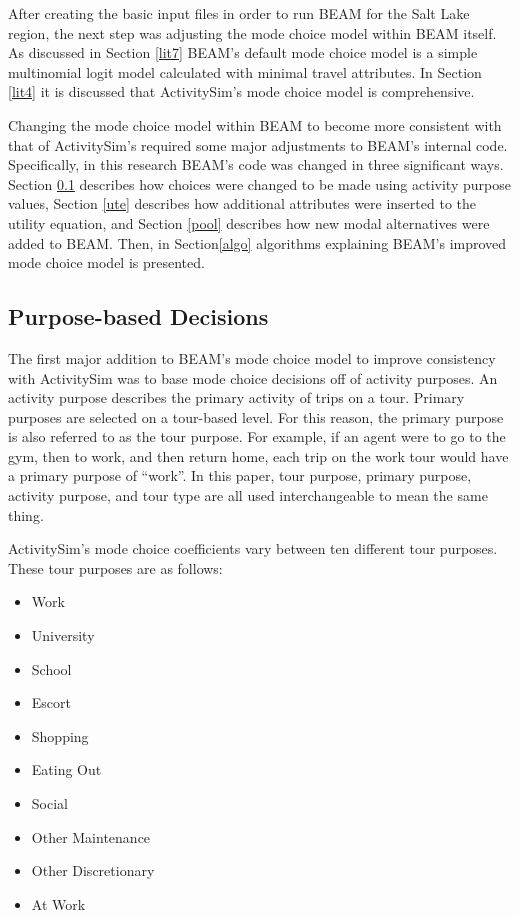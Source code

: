 \documentclass[12pt, oneside, openright]{byuthesis}
\providecommand{\tightlist}{%
  \setlength{\itemsep}{0pt}\setlength{\parskip}{0pt}}
\begin{document}
After creating the basic input files in order to run BEAM for the Salt Lake region, the next step was adjusting the mode choice model within BEAM itself. As discussed in Section \ref{lit7} BEAM's default mode choice model is a simple multinomial logit model calculated with minimal travel attributes. In Section \ref{lit4} it is discussed that ActivitySim's mode choice model is comprehensive.

Changing the mode choice model within BEAM to become more consistent with that of ActivitySim's required some major adjustments to BEAM's internal code. Specifically, in this research BEAM's code was changed in three significant ways. Section \ref{purp} describes how choices were changed to be made using activity purpose values, Section \ref{ute} describes how additional attributes were inserted to the utility equation, and Section \ref{pool} describes how new modal alternatives were added to BEAM. Then, in Section\ref{algo} algorithms explaining BEAM's improved mode choice model is presented.

\hypertarget{purp}{%
\subsection{Purpose-based Decisions}\label{purp}}

The first major addition to BEAM's mode choice model to improve consistency with ActivitySim was to base mode choice decisions off of activity purposes. An activity purpose describes the primary activity of trips on a tour. Primary purposes are selected on a tour-based level. For this reason, the primary purpose is also referred to as the tour purpose. For example, if an agent were to go to the gym, then to work, and then return home, each trip on the work tour would have a primary purpose of ``work''. In this paper, tour purpose, primary purpose, activity purpose, and tour type are all used interchangeable to mean the same thing.

ActivitySim's mode choice coefficients vary between ten different tour purposes. These tour purposes are as follows:

\begin{itemize}
\tightlist
\item
  Work
\item
  University
\item
  School
\item
  Escort
\item
  Shopping
\item
  Eating Out
\item
  Social
\item
  Other Maintenance
\item
  Other Discretionary
\item
  At Work
\end{itemize}
\end{document}
